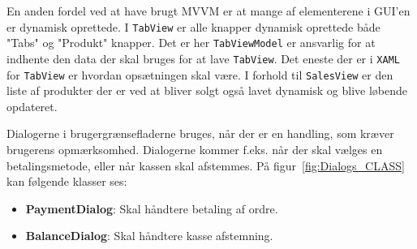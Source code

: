 En anden fordel ved at have brugt MVVM er at mange af elementerene i GUI'en er dynamisk oprettede. I \texttt{TabView} er alle knapper dynamisk oprettede både "Tabs" og "Produkt" knapper. 
Det er her \texttt{TabViewModel} er ansvarlig for at indhente den data der skal bruges for at lave \texttt{TabView}. Det eneste der er i \texttt{XAML} for \texttt{TabView} er hvordan opsætningen skal være.
I forhold til \texttt{SalesView} er den liste af produkter der er ved at bliver solgt også lavet dynamisk og blive løbende opdateret.


Dialogerne i brugergrænsefladerne bruges, når der er en handling, som kræver brugerens opmærksomhed. Dialogerne kommer f.eks. når der skal vælges en betalingsmetode, eller når kassen skal afstemmes. På figur~\ref{fig:Dialogs_CLASS} kan følgende klasser ses:
\begin{itemize}
	\item \textbf{PaymentDialog}: Skal håndtere betaling af ordre.
	\item \textbf{BalanceDialog}: Skal håndtere kasse afstemning.
\end{itemize}